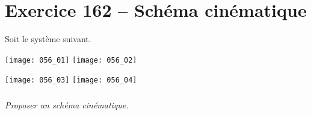 \section*{Exercice 162 -- Schéma cinématique}

\setcounter{exo}{0}

Soit le système suivant. 

\begin{center}
 \texttt{[image: 056\_01]}
 \texttt{[image: 056\_02]}
\end{center}

\begin{center}
 \texttt{[image: 056\_03]}
 \texttt{[image: 056\_04]}
\end{center}



\subparagraph{}
\textit{Proposer un schéma cinématique.}
 \ifprof
 \begin{corrige}
 
 \end{corrige}
 \else
 \fi

